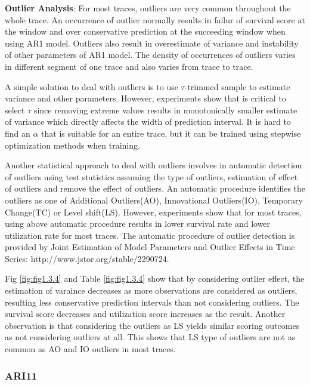 \documentclass{article}
\begin{document}
\begin{flushleft}
\textbf{Outlier Analysis}: For most traces, outliers are very common throughout the whole trace. An occurrence of outlier normally results in failur of survival score at the window and over conservative prediction at the succeeding window when using AR1 model. Outliers also result in overestimate of variance and instability of other parameters of AR1 model. The density of occurrences of outliers varies in different segment of one trace and also varies from trace to trace.  

A simple solution to deal with outliers is to use $\tau$-trimmed sample to estimate variance and other parameters. However, experiments show that is critical to select $\tau$ since removing extreme values results in monotonically smaller estimate of variance which directly affects the width of prediction interval. It is hard to find an $\alpha$ that is suitable for an entire trace, but it can be trained using stepwise optimization methods when training.

Another statistical approach to deal with outliers involves in automatic detection of outliers using test statistics assuming the type of outliers, estimation of effect of outliers and remove the effect of outliers. An automatic procedure identifies the outliers as one of Additional Outliers(AO), Innovational Outliers(IO), Temporary Change(TC) or Level shift(LS). However, experiments show that for most traces, using above automatic procedure results in lower survival rate and lower utilization rate for most traces. The automatic procedure of outlier detection is provided by Joint Estimation of Model Parameters and Outlier Effects in Time Series: http://www.jstor.org/stable/2290724.

Fig \ref{fig:fig1.3.4} and Table \ref{fig:fig1.3.4} show that by considering outlier effect, the estimation of varaince decreases as more observations are considered as outliers, resulting less conservative prediction intervals than not considering outliers. The survival score decreases and utilization score increases as the result. Another observation is that considering the outliers as LS yields similar scoring outcomes as not considering outliers at all. This shows that LS type of outliers are not as common as AO and IO outliers in most traces.
\end{flushleft}

\subsubsection{ARI11}
\end{document}
